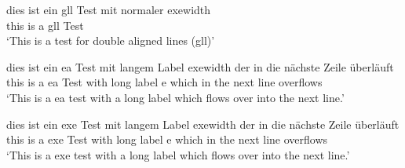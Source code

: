 \ea
 \gll dies ist ein gll Test mit normaler exewidth\\
      this is a gll Test\\
 \glt `This is a test for double aligned lines (gll)'
\z

\setcounter{xnumi}{123}
\setcounter{equation}{123}

\ea
 \gll dies ist ein ea Test mit langem Label exewidth der in die nächste Zeile überläuft\\
      this is a ea Test with long label e which in the next line overflows\\
 \glt `This is a ea test with a long label which flows over into the next line.'
\z

\begin{exe}
 \ex
 \gll dies ist ein exe Test mit langem Label exewidth der in die nächste Zeile überläuft\\
      this is a exe Test with long label e which in the next line overflows\\
 \glt `This is a exe test with a long label which flows over into the next line.' 
\end{exe}


\setcounter{equation}{16} 